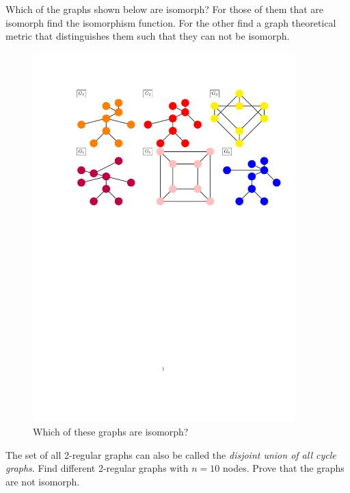 \exercise[%
  topic = Graph isomorphism 
    ]
		
		\subexercise[%
  topic=Check the isomorphism between graphs,
    ]
		
		
Which of the graphs shown below are isomorph? For those of them that are isomorph find the isomorphism function. For the other find a graph theoretical metric that distinguishes them such that they can not be isomorph.		
		
\begin{figure}[h]
    \centering
    \includegraphics[width=0.9\textwidth]{isomorphism_cut.pdf}
    \caption{\label{isomorphismus} Which of these graphs are isomorph?}
\end{figure}

\subexercise[%
  topic=2-regular Graphs,
    ]

The set of all 2-regular graphs can also be called the \emph{disjoint union of all cycle graphs}. Find different 2-regular graphs with $n=10$ nodes. Prove that the graphs are not isomorph.
    
